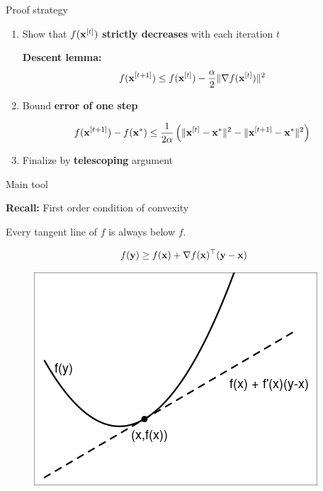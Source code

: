 \documentclass[11pt,compress,t,notes=noshow, xcolor=table]{beamer}
\begin{document}
\begin{vbframe}{Proof strategy}

\begin{enumerate}
    \item Show that $f(\mathbf{x}^{[t]})$ \textbf{strictly decreases} with each iteration $t$
        \begin{framed}
            \textbf{Descent lemma:}
            \begin{equation*}
                f(\mathbf{x}^{[t+1]}) \le f(\mathbf{x}^{[t]}) - \frac{\alpha}{2} \|\nabla f(\mathbf{x}^{[t]})\|^2
            \end{equation*}
        \end{framed}
    \item Bound \textbf{error of one step}
        \begin{framed}
            \begin{equation*}
                f(\mathbf{x}^{[t+1]}) - f(\mathbf{x}^\ast) \leq \frac{1}{2 \alpha} \left( \|\mathbf{x}^{[t]}-\mathbf{x}^\ast\|^2 - \| \mathbf{x}^{[t+1]} - \mathbf{x}^\ast \|^2 \right)
            \end{equation*}
        \end{framed}
    \item Finalize by \textbf{telescoping} argument
\end{enumerate}

\end{vbframe}

\begin{vbframe}{Main tool}

\textbf{Recall:} First order condition of convexity

\begin{framed}
    \centering
    Every tangent line of $f$ is always below $f$.

    \vspace*{-\baselineskip}

    \begin{equation*}
        f(\mathbf{y}) \geq f(\mathbf{x}) + \nabla f(\mathbf{x})^\top (\mathbf{y} - \mathbf{x})
    \end{equation*}

    \vspace*{-0.5\baselineskip}

    \begin{figure}
        \centering
        \includegraphics[width=0.4\linewidth]{../01-mathematical-concepts/figure_man/conv-first-order-cond.png}
    \end{figure}
\end{framed}

\end{vbframe}
\end{document}
